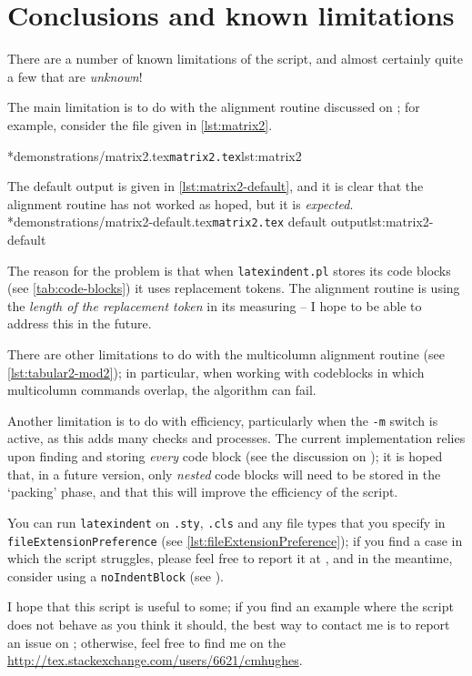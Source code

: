 \section{Conclusions and known limitations}
 \label{sec:knownlimitations}
 There are a number of known limitations of the script, and almost certainly quite a few that are \emph{unknown}!

 The main limitation is to do with the alignment routine discussed on ; for example, consider the file given in \cref{lst:matrix2}.

 \cmhlistingsfromfile*[showspaces=false,showtabs=false]*{demonstrations/matrix2.tex}{\texttt{matrix2.tex}}{lst:matrix2}

 The default output is given in \cref{lst:matrix2-default}, and it is clear that the alignment routine has not worked as hoped, but it is \emph{expected}.
 \cmhlistingsfromfile*[showspaces=false,showtabs=false]*{demonstrations/matrix2-default.tex}{\texttt{matrix2.tex} default output}{lst:matrix2-default}

 The reason for the problem is that when \texttt{latexindent.pl} stores its code blocks (see \vref{tab:code-blocks}) it uses replacement tokens.
 The alignment routine is using the \emph{length of the replacement token} in its measuring -- I hope to be able to address this in the future.

 There are other limitations to do with the multicolumn alignment routine (see \vref{lst:tabular2-mod2}); in particular, when working with codeblocks in which multicolumn commands overlap, the algorithm can fail.

 Another limitation is to do with efficiency, particularly when the \texttt{-m} switch is active, as this adds many checks and processes.
 The current implementation relies upon finding and storing \emph{every} code block (see the discussion on ); it is hoped that, in a future version, only \emph{nested} code blocks will need to be stored in the `packing' phase, and that this will improve the efficiency of the script.

 You can run \texttt{latexindent} on \texttt{.sty}, \texttt{.cls} and any file types that you specify in \lstinline[breaklines=true]!fileExtensionPreference! (see \vref{lst:fileExtensionPreference}); if you find a case in which the script struggles, please feel free to report it at \cite{latexindent-home}, and in the meantime, consider using a \texttt{noIndentBlock} (see ).

 I hope that this script is useful to some; if you find an example where the script does not behave as you think it should, the best way to contact me is to report an issue on \cite{latexindent-home}; otherwise, feel free to find me on the \url{http://tex.stackexchange.com/users/6621/cmhughes}.
